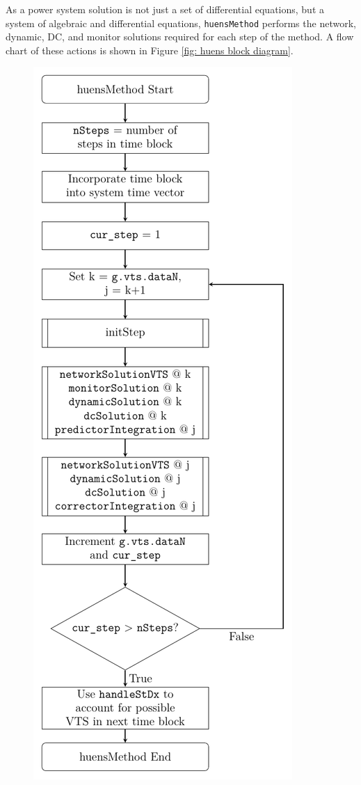 
As a power system solution is not just a set of differential equations, but a system of algebraic and differential equations,
\verb|huensMethod| performs the network, dynamic, DC, and monitor solutions required for each step of the method.
A flow chart of these actions is shown in Figure \ref{fig: huens block diagram}.

\begin{figure}[H]
	\centering
	\footnotesize
	\includegraphics[height=.85\textheight]{../../one-offs/200913-huensMethodBlockDiagram/200913-huensMethodBlockDiagram}

\end{figure}
